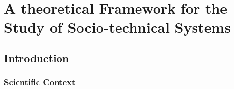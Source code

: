 \newpage

\section{A theoretical Framework for the Study of Socio-technical Systems}



\subsection*{Introduction}

\subsubsection*{Scientific Context}



